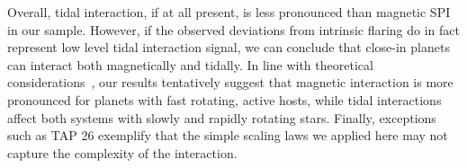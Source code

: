 \documentclass[twocolumn]{aastex631}
\begin{document}
Overall, tidal interaction, if at all present, is less pronounced than magnetic SPI in our sample. However, if the observed deviations from intrinsic flaring do in fact represent low level tidal interaction signal, we can conclude that close-in planets can interact both magnetically and tidally. In line with theoretical considerations~\citep{strugarek2017fate}, our results tentatively suggest that magnetic interaction is more pronounced for planets with fast rotating, active hosts, while tidal interactions affect both systems with slowly and rapidly rotating stars. Finally, exceptions such as TAP 26 exemplify that the simple scaling laws we applied here may not capture the complexity of the interaction.



\end{document}
